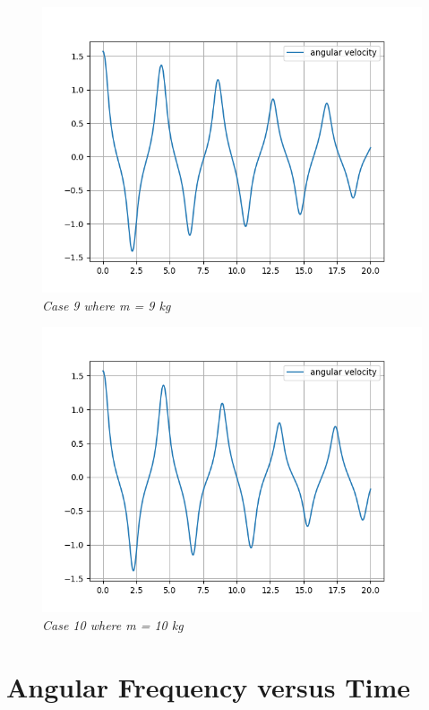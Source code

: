         \begin{figure}[H]
            \centering
            \includegraphics{Appendix/RSimPictures/A/am9.png}
            \caption{\textit{Case 9 where m = 9 kg}}
            \label{}
        \end{figure}
            
        \begin{figure}[H]
            \centering
            \includegraphics{Appendix/RSimPictures/A/am10.png}
            \caption{\textit{Case 10 where m = 10 kg}}
            \label{}
        \end{figure}
            
    \section{{Angular Frequency versus Time}}
            
